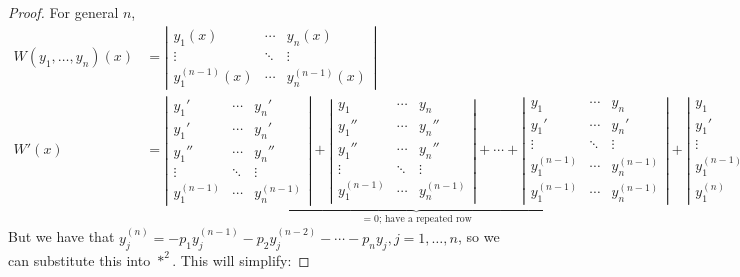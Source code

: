 \begin{proof}
For general $n$, \begin{align*}
    W(y_1, \dots, y_n)(x) &= \left|\begin{matrix}
        y_1(x) & \cdots & y_n(x)\\
        \vdots & \ddots & \vdots\\
        y_1^{(n-1)}(x) & \cdots &y_n^{(n-1)}(x)
    \end{matrix}\right|\\
    W'(x) &= \underbrace{\left|\begin{matrix}
        y_1' & \cdots & y_n'\\
        y_1' & \cdots & y_n'\\
        y_1'' & \cdots & y_n''\\
        \vdots & \ddots & \vdots \\
        y_1^{(n-1)} & \cdots & y_n^{(n-1)}
    \end{matrix}\right| +  \left|\begin{matrix}
        y_1 & \cdots & y_n\\
        y_1'' & \cdots & y_n''\\
        y_1'' & \cdots & y_n''\\
        \vdots & \ddots & \vdots \\
        y_1^{(n-1)} & \cdots & y_n^{(n-1)}
    \end{matrix}\right| + \cdots + \left|\begin{matrix}
        y_1 & \cdots & y_n\\
        y_1' & \cdots & y_n'\\
        \vdots & \ddots & \vdots \\
        y_1^{(n-1)} & \cdots & y_n^{(n-1)}\\
        y_1^{(n-1)} & \cdots & y_n^{(n-1)}
    \end{matrix}\right|}_{=0 \text{; have a repeated row}} +\left|
        \begin{matrix}
        y_1 & \cdots & y_n\\
        y_1' & \cdots & y_n'\\
        \vdots & \ddots & \vdots \\
        y_1^{(n-1)} & \cdots & y_n^{n-1}\\
        y_1^{(n)} & \cdots & y_n^{(n)}
    \end{matrix}\right|  \quad \ast^2
\end{align*}
But we have that $y_j^{(n)} = -p_1y_j^{(n-1)} - p_2y_j^{(n-2)} - \cdots - p_n y_j, j = 1, \dots, n$, so we can substitute this into $\ast^2$. This will simplify:

\end{proof}
